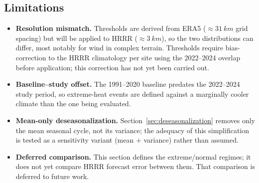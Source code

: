 \subsection{Limitations}\label{sec:extreme_limitations}

\begin{itemize}
  \item \textbf{Resolution mismatch.} Thresholds are derived from ERA5 ($\approx\SI{31}{km}$
        grid spacing) but will be applied to HRRR ($\approx\SI{3}{km}$), so the two distributions
        can differ, most notably for wind in complex terrain. Thresholds require bias-correction
        to the HRRR climatology per site using the \num{2022}--\num{2024} overlap before
        application; this correction has not yet been carried out.
  \item \textbf{Baseline--study offset.} The 1991--2020 baseline predates the 2022--2024 study
        period, so extreme-heat events are defined against a marginally cooler climate than the
        one being evaluated.
  \item \textbf{Mean-only deseasonalization.} Section~\ref{sec:deseasonalization} removes only the
        mean seasonal cycle, not its variance; the adequacy of this simplification is tested as a
        sensitivity variant (mean $+$ variance) rather than assumed.
  \item \textbf{Deferred comparison.} This section defines the extreme/normal regimes; it does not
        yet compare HRRR forecast error between them. That comparison is deferred to future work.
\end{itemize}
